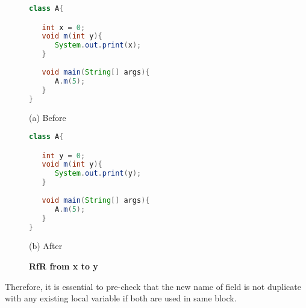 \begin{figure}[th]
\centering
\begin{minipage}[t]{0.45\linewidth}
\begin{lstlisting}[language=java, basicstyle=\scriptsize\ttfamily,frame=single]
class A{

   int x = 0;
   void m(int y){
      System.out.print(x);
   }
	
   void main(String[] args){
      A.m(5);
   }
}
\end{lstlisting}
\centering(a) Before
\end{minipage}
\hfill
\begin{minipage}[t]{0.45\linewidth}
\begin{lstlisting}[language=java, basicstyle=\scriptsize\ttfamily,frame=single]
class A{

   int y = 0;
   void m(int y){
      System.out.print(y);
   }
	
   void main(String[] args){
      A.m(5);
   }
}\end{lstlisting}
\centering(b) After
\end{minipage}
\caption{\textbf{RfR from x to y}}
\label{figure:sameBlock}
\end{figure}

Therefore, it is essential to pre-check that the new name of field is not duplicate with any existing local variable if both are used in same block. 